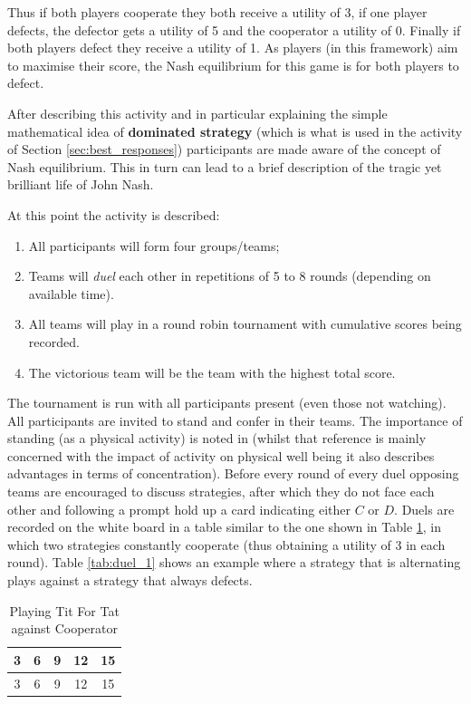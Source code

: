 \documentclass{article}
\begin{document}
Thus if both players cooperate they both receive a utility of 3, if one player
defects, the defector gets a utility of 5 and the cooperator a utility of 0.
Finally if both players defect they receive a utility of 1. As players (in this
framework) aim to maximise their score, the Nash equilibrium for this game is
for both players to defect.

After describing this activity and in particular explaining the simple
mathematical idea of \textbf{dominated strategy} (which is what is used in the
activity of Section \ref{sec:best_responses}) participants are made aware of the
concept of Nash equilibrium. This in turn can lead to a brief description of the
tragic yet brilliant life of John Nash.

At this point the activity is described:

\begin{enumerate}
    \item All participants will form four groups/teams;
    \item Teams will \textit{duel} each other in repetitions of 5 to 8 rounds
        (depending on available time).
    \item All teams will play in a round robin tournament with cumulative scores
        being recorded.
    \item The victorious team will be the team with the highest total score.
\end{enumerate}

The tournament is run with all participants present (even those not watching).
All participants are invited to stand and confer in their teams. The importance
of standing (as a physical activity) is noted in \cite{Donnelly2011} (whilst
that reference is mainly concerned with the impact of activity on physical well
being it also describes advantages in terms of concentration).  Before every
round of every duel opposing teams are encouraged to discuss strategies, after
which they do not face each other and following a prompt hold up a card
indicating either \(C\) or \(D\).  Duels are recorded on the white board in a
table similar to the one shown in Table \ref{tab:duel}, in which two strategies
constantly cooperate (thus obtaining a utility of 3 in each round). Table
\ref{tab:duel_1} shows an example where a strategy that is alternating plays
against a strategy that always defects.

\begin{table}[!htbp]
    \caption{Playing Tit For Tat against Cooperator}
    \centering
    \begin{tabular}{ccccc}
        \toprule
        3&6&9&12&15\\
        \midrule
        3&6&9&12&15\\
        \bottomrule
    \end{tabular}
    \label{tab:duel}
\end{table}
\end{document}

